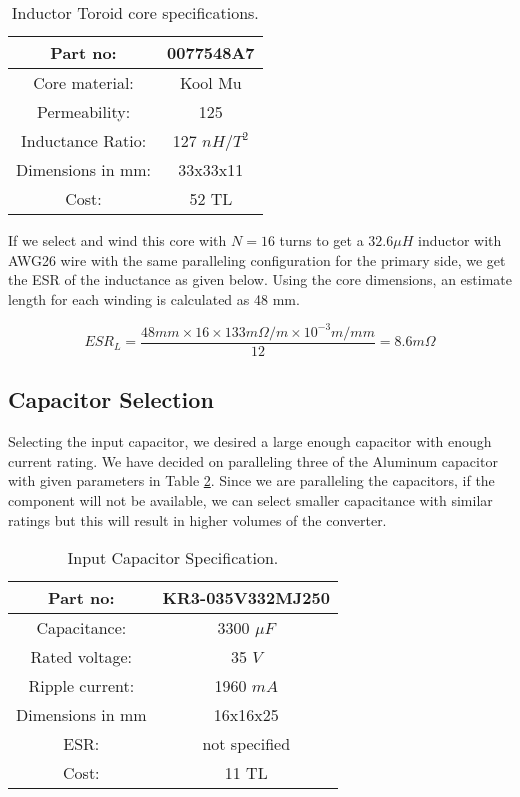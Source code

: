 \begin{table}[H]
    \centering
    \caption{Inductor Toroid core specifications.\cite{web:tor_core}}
    \label{tab:toroid_core}
    \begin{tabular}{|c|c|}
        \hline
        Part no:            & 0077548A7         \\
        \hline
        Core material:      & Kool Mu           \\
        \hline
        Permeability:       & 125               \\
        \hline
        Inductance Ratio:   & 127 $nH/T^2$      \\
        \hline
        Dimensions in mm:   & 33x33x11          \\
        \hline
        Cost:               & 52 TL             \\
        \hline
    \end{tabular}
\end{table}

If we select and wind this core with $N=16$ turns to get a $32.6\mu H$ inductor with AWG26 wire with the same paralleling configuration for the primary side, we get the ESR of the inductance as given below. Using the core dimensions, an estimate length for each winding is calculated as 48 mm.

\begin{equation}
    ESR_{L}=\frac{48 mm\times16\times133 m\Omega/m\times10^{-3}m/mm}{12}=8.6 m\Omega
\end{equation}

\subsection{Capacitor Selection}
Selecting the input capacitor, we desired a large enough capacitor with enough current rating. We have decided on paralleling three of the Aluminum capacitor with given parameters in Table \ref{tab:input_cap}. Since we are paralleling the capacitors, if the component will not be available, we can select smaller capacitance with similar ratings but this will result in higher volumes of the converter.

\begin{table}[H]
    \centering
    \caption{Input Capacitor Specification.\cite{web:input_cap}}
    \label{tab:input_cap}
    \begin{tabular}{|c|c|}
        \hline
        Part no:        & KR3-035V332MJ250  \\
        \hline
        Capacitance:    & 3300 $\mu F$      \\
        \hline
        Rated voltage:  & 35 $V$             \\
        \hline
        Ripple current: & 1960 $mA$         \\
        \hline
        Dimensions in mm & 16x16x25          \\
        \hline
        ESR:            & not specified     \\
        \hline
        Cost:           & 11 TL             \\
        \hline
    \end{tabular}
\end{table}

